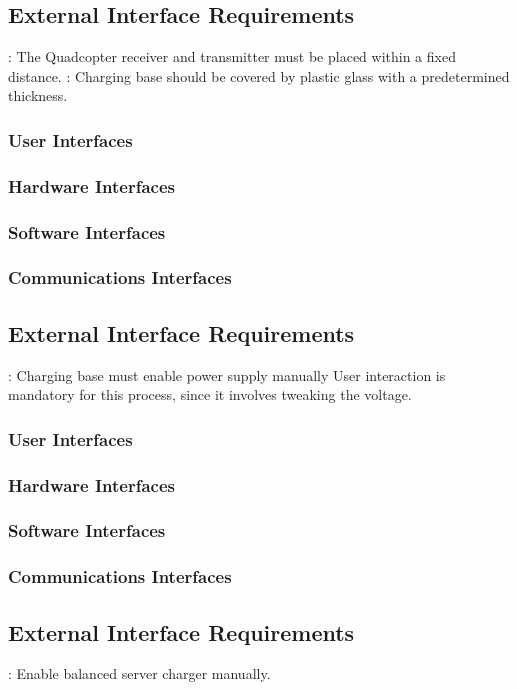 \documentclass[a4paper]{article}
\begin{document}
\subsection{External Interface Requirements}
: The Quadcopter receiver and transmitter must be placed within a fixed distance.
: Charging base should be covered by plastic glass with a predetermined thickness.

\subsubsection{User Interfaces}
\subsubsection{Hardware Interfaces}
\subsubsection{Software Interfaces}
\subsubsection{Communications Interfaces}

\subsection{External Interface Requirements}
: Charging base must enable power supply manually User interaction is mandatory for this process, since it involves tweaking the voltage.
\subsubsection{User Interfaces}
\subsubsection{Hardware Interfaces}
\subsubsection{Software Interfaces}
\subsubsection{Communications Interfaces}

\subsection{External Interface Requirements}
: Enable balanced server charger manually.
\end{document}
